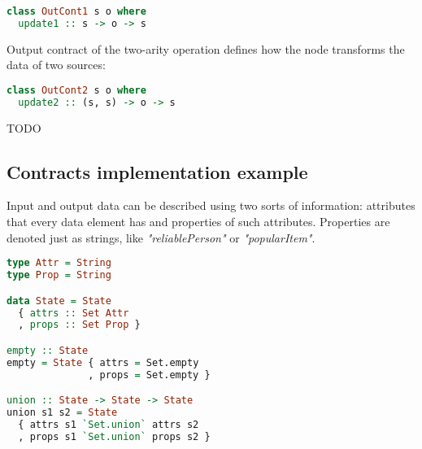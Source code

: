 \begin{lstlisting}[language=Haskell]
class OutCont1 s o where
  update1 :: s -> o -> s
\end{lstlisting}

Output contract of the two-arity operation defines how the node transforms the data of two sources:

\begin{lstlisting}[language=Haskell]
class OutCont2 s o where
  update2 :: (s, s) -> o -> s
\end{lstlisting}

TODO

\subsection{Contracts implementation example}


Input and output data can be described using two sorts of information: attributes that every data element has and properties of such attributes.
Properties are denoted just as strings, like {\em "reliablePerson"} or {\em "popularItem"}.

\begin{lstlisting}[language=Haskell]
type Attr = String
type Prop = String

data State = State
  { attrs :: Set Attr
  , props :: Set Prop }

empty :: State
empty = State { attrs = Set.empty
              , props = Set.empty }

union :: State -> State -> State
union s1 s2 = State
  { attrs s1 `Set.union` attrs s2
  , props s1 `Set.union` props s2 }
\end{lstlisting}


